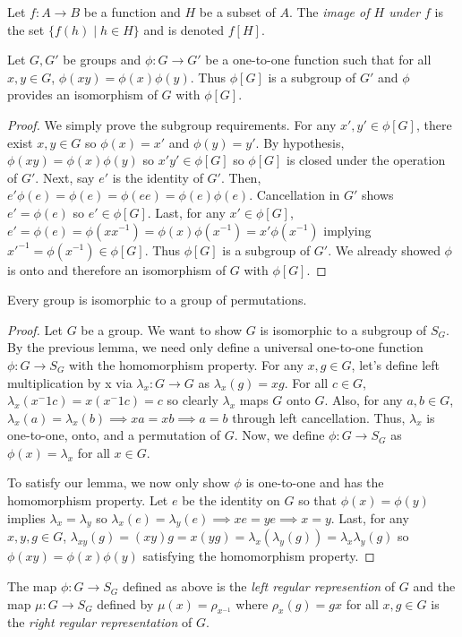 \begin{definition}
    Let $f\colon A\to B$ be a function and $H$ be a subset of $A$. The \emph{image of $H$ under $f$} is the set $\{f(h) \mid h \in H\}$ and is denoted $f[H].$
\end{definition}
\begin{lemma}
    Let $G, G'$ be groups and $\phi\colon G\to G'$ be a one-to-one function such that for all $x,y \in G$, $\phi(xy) = \phi(x)\phi(y).$ Thus $\phi[G]$ is a subgroup of $G'$ and $\phi$ provides an isomorphism of $G$ with $\phi[G]$.
\end{lemma}
\begin{proof}
    We simply prove the subgroup requirements. For any $x', y' \in \phi[G]$, there exist $x,y \in G$ so $\phi(x)=x'$ and $\phi(y)=y'$. By hypothesis, $\phi(xy) = \phi(x)\phi(y)$ so $x'y' \in \phi[G]$ so $\phi[G]$ is closed under the operation of $G'$. Next, say $e'$ is the identity of $G'$. Then, $e'\phi(e) = \phi(e) = \phi(ee) = \phi(e)\phi(e)$. Cancellation in $G'$ shows $e'=\phi(e)$ so $e' \in \phi[G]$. Last, for any $x' \in \phi[G]$, $e'=\phi(e)=\phi(xx^{-1})=\phi(x)\phi(x^{-1})=x'\phi(x^{-1})$ implying $x'^{-1} = \phi(x^{-1}) \in \phi[G]$. Thus $\phi[G]$ is a subgroup of $G'$. We already showed $\phi$ is onto and therefore an isomorphism of $G$ with $\phi[G]$.
\end{proof}
\begin{theorem}
    Every group is isomorphic to a group of permutations.
\end{theorem}
\begin{proof}
    Let $G$ be a group. We want to show $G$ is isomorphic to a subgroup of $S_G$. By the previous lemma, we need only define a universal one-to-one function $\phi\colon G\to S_G$ with the homomorphism property. For any $x,g \in G$, let's define left multiplication by x via $\lambda_x\colon G\to G$ as $\lambda_x(g)=xg$. For all $c \in G$, $\lambda_x(x^-1c)=x(x^-1c)=c$ so clearly $\lambda_x$ maps $G$ onto $G$. Also, for any $a,b \in G$, $\lambda_x(a)=\lambda_x(b) \implies xa=xb \implies a=b$ through left cancellation. Thus, $\lambda_x$ is one-to-one, onto, and a permutation of $G$. Now, we define $\phi\colon G\to S_G$ as $\phi(x)=\lambda_x$ for all $x\in G$.

    To satisfy our lemma, we now only show $\phi$ is one-to-one and has the homomorphism property. Let $e$ be the identity on $G$ so that $\phi(x)=\phi(y)$ implies $\lambda_x=\lambda_y$ so $\lambda_x(e)=\lambda_y(e)\implies xe=ye \implies x=y$. Last, for any $x,y,g\in G$, $\lambda_{xy}(g) = (xy)g = x(yg) = \lambda_x(\lambda_y(g)) = \lambda_x\lambda_y(g)$ so $\phi(xy)=\phi(x)\phi(y)$ satisfying the homomorphism property.
\end{proof}
\begin{definition}
    The map $\phi\colon G \to S_G$ defined as above is the \emph{left regular represention} of $G$ and the map $\mu\colon G \to S_G$ defined by $\mu(x)=\rho_{x^{-1}}$ where $\rho_x(g)=gx$ for all $x,g\in G$ is the \emph{right regular representation} of $G$.
\end{definition}

